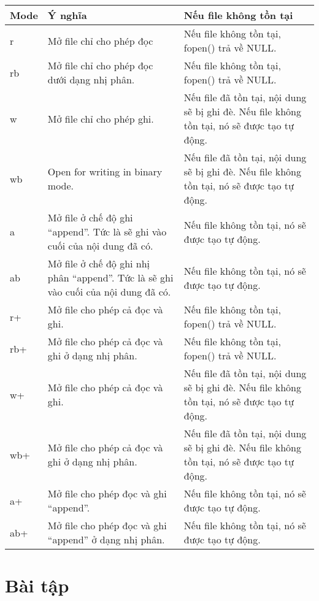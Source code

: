 \documentclass[12pt,a4paper]{article}
\begin{document}
\begin{tabular}{|p{2cm}|p{5cm}|p{6cm}|}
\hline
\textbf{Mode} &	\textbf{Ý nghĩa}	& \textbf{Nếu file không tồn tại}\\
\hline
r &	Mở file chỉ cho phép đọc &	Nếu file không tồn tại, fopen() trả về NULL.\\
\hline
rb &	Mở file chỉ cho phép đọc dưới dạng nhị phân. &	Nếu file không tồn tại, fopen() trả về NULL.\\
\hline
w &	Mở file chỉ cho phép ghi.&	Nếu file đã tồn tại, nội dung sẽ bị ghi đè.  Nếu file không tồn tại, nó sẽ được tạo tự động.\\
\hline
wb &	Open for writing in binary mode.	& Nếu file đã tồn tại, nội dung sẽ bị ghi đè.  Nếu file không tồn tại, nó sẽ được tạo tự động.\\
\hline
a &	Mở file ở chế độ ghi “append”. Tức là sẽ ghi vào cuối của nội dung đã có.	& Nếu file không tồn tại, nó sẽ được tạo tự động.\\
\hline
ab &	Mở file ở chế độ ghi nhị phân “append”. Tức là sẽ ghi vào cuối của nội dung đã có. &	Nếu file không tồn tại, nó sẽ được tạo tự động.\\
\hline
r+ &	Mở file cho phép cả đọc và ghi. &	Nếu file không tồn tại, fopen() trả về NULL.\\
\hline
rb+	& Mở file cho phép cả đọc và ghi ở dạng nhị phân. &	Nếu file không tồn tại, fopen() trả về NULL.\\
\hline
w+	& Mở file cho phép cả đọc và ghi. &	Nếu file đã tồn tại, nội dung sẽ bị ghi đè. Nếu file không tồn tại, nó sẽ được tạo tự động.\\
\hline
wb+	& Mở file cho phép cả đọc và ghi ở dạng nhị phân. &	Nếu file đã tồn tại, nội dung sẽ bị ghi đè. Nếu file không tồn tại, nó sẽ được tạo tự động.\\
\hline
a+	& Mở file cho phép đọc và ghi “append”.	& Nếu file không tồn tại, nó sẽ được tạo tự động.\\
\hline
ab+	& Mở file cho phép đọc và ghi “append” ở dạng nhị phân.	& Nếu file không tồn tại, nó sẽ được tạo tự động.\\
\hline
\end{tabular}



\section{Bài tập}
\end{document}
